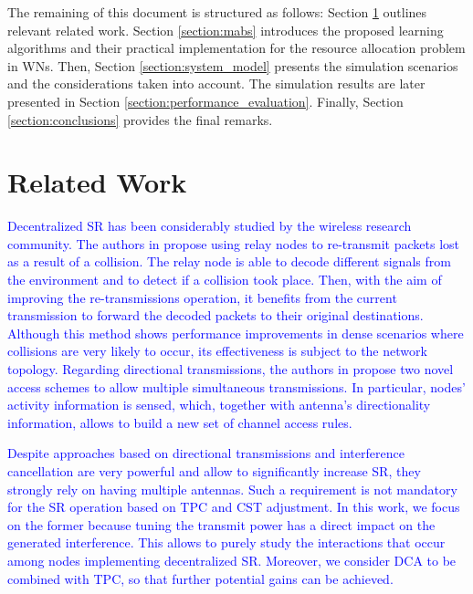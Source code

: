 \documentclass[preprint,12pt]{elsarticle}
\begin{document}
	The remaining of this document is structured as follows: Section \ref{section:related_work} outlines relevant related work. Section \ref{section:mabs} introduces the proposed learning algorithms and their practical implementation for the resource allocation problem in WNs. Then, Section \ref{section:system_model} presents the simulation scenarios and the considerations taken into account. The simulation results are later presented in Section \ref{section:performance_evaluation}. Finally, Section \ref{section:conclusions} provides the final remarks.
	
	\section{Related Work}
	\label{section:related_work} 
	
	\textcolor{blue}{Decentralized SR has been considerably studied by the wireless research community. The authors in \cite{argyriou2010collision} propose using relay nodes to re-transmit packets lost as a result of a collision. The relay node is able to decode different signals from the environment and to detect if a collision took place. Then, with the aim of improving the re-transmissions operation, it benefits from the current transmission to forward the decoded packets to their original destinations. Although this method shows performance improvements in dense scenarios where collisions are very likely to occur, its effectiveness is subject to the network topology. Regarding directional transmissions, the authors in \cite{babich2015design} propose two novel access schemes to allow multiple simultaneous transmissions. In particular, nodes' activity information is sensed, which, together with antenna's directionality information, allows to build a new set of channel access rules.}
	
	\textcolor{blue}{Despite approaches based on directional transmissions and interference cancellation are very powerful and allow to significantly increase SR, they strongly rely on having multiple antennas. Such a requirement is not mandatory for the SR operation based on TPC and CST adjustment. In this work, we focus on the former because tuning the transmit power has a direct impact on the generated interference. This allows to purely study the interactions that occur among nodes implementing decentralized SR. Moreover, we consider DCA to be combined with TPC, so that further potential gains can be achieved.}
	
\end{document}
